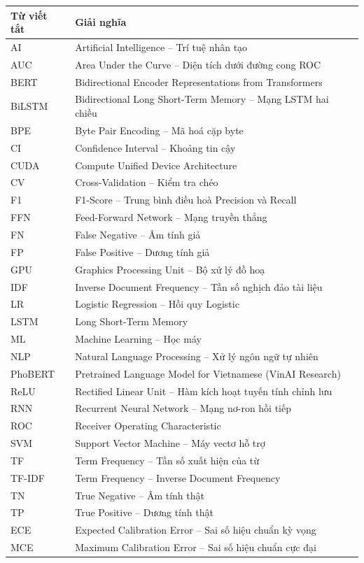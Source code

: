 \documentclass[12pt, a4paper]{report}
\begin{document}
\vspace{0.5em}
\noindent\begin{longtable}{p{3.2cm} p{10.8cm}}
\toprule
\textbf{Từ viết tắt} & \textbf{Giải nghĩa} \\
\midrule
AI      & Artificial Intelligence -- Trí tuệ nhân tạo \\[0.3em]
AUC     & Area Under the Curve -- Diện tích dưới đường cong ROC \\[0.3em]
BERT    & Bidirectional Encoder Representations from Transformers \\[0.3em]
BiLSTM  & Bidirectional Long Short-Term Memory -- Mạng LSTM hai chiều \\[0.3em]
BPE     & Byte Pair Encoding -- Mã hoá cặp byte \\[0.3em]
CI      & Confidence Interval -- Khoảng tin cậy \\[0.3em]
CUDA    & Compute Unified Device Architecture \\[0.3em]
CV      & Cross-Validation -- Kiểm tra chéo \\[0.3em]
F1      & F1-Score -- Trung bình điều hoà Precision và Recall \\[0.3em]
FFN     & Feed-Forward Network -- Mạng truyền thẳng \\[0.3em]
FN      & False Negative -- Âm tính giả \\[0.3em]
FP      & False Positive -- Dương tính giả \\[0.3em]
GPU     & Graphics Processing Unit -- Bộ xử lý đồ hoạ \\[0.3em]
IDF     & Inverse Document Frequency -- Tần số nghịch đảo tài liệu \\[0.3em]
LR      & Logistic Regression -- Hồi quy Logistic \\[0.3em]
LSTM    & Long Short-Term Memory \\[0.3em]
ML      & Machine Learning -- Học máy \\[0.3em]
NLP     & Natural Language Processing -- Xử lý ngôn ngữ tự nhiên \\[0.3em]
PhoBERT & Pretrained Language Model for Vietnamese (VinAI Research) \\[0.3em]
ReLU    & Rectified Linear Unit -- Hàm kích hoạt tuyến tính chỉnh lưu \\[0.3em]
RNN     & Recurrent Neural Network -- Mạng nơ-ron hồi tiếp \\[0.3em]
ROC     & Receiver Operating Characteristic \\[0.3em]
SVM     & Support Vector Machine -- Máy vectơ hỗ trợ \\[0.3em]
TF      & Term Frequency -- Tần số xuất hiện của từ \\[0.3em]
TF-IDF  & Term Frequency -- Inverse Document Frequency \\[0.3em]
TN      & True Negative -- Âm tính thật \\[0.3em]
TP      & True Positive -- Dương tính thật \\[0.3em]
ECE     & Expected Calibration Error -- Sai số hiệu chuẩn kỳ vọng \\[0.3em]
MCE     & Maximum Calibration Error -- Sai số hiệu chuẩn cực đại \\
\bottomrule
\end{longtable}
\newpage
\end{document}
